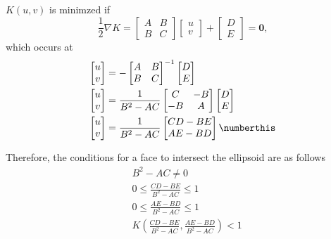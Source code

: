 $K(u,v)$ is minimzed if
\begin{equation}
    \frac{1}{2}\nabla K =
    \begin{bmatrix} A & B \\ B & C \end{bmatrix}
    \begin{bmatrix} u \\ v \end{bmatrix}
    + \begin{bmatrix} D \\ E \end{bmatrix}
    = \bm{0},
\end{equation}
which occurs at
\begin{align*}
    \begin{bmatrix} u \\ v \end{bmatrix} &= -\begin{bmatrix} A & B \\ B & C \end{bmatrix}^{-1} \begin{bmatrix} D \\ E \end{bmatrix} \\
    \begin{bmatrix} u \\ v \end{bmatrix} &= \frac{1}{B^2 - AC} \begin{bmatrix} C & -B \\ -B & A \end{bmatrix} \begin{bmatrix} D \\ E \end{bmatrix} \\
    \begin{bmatrix} u \\ v \end{bmatrix} &= \frac{1}{B^2 - AC} \begin{bmatrix} CD - BE \\ AE - BD \end{bmatrix} \numberthis
\end{align*}

Therefore, the conditions for a face to intersect the ellipsoid are as follows
\begin{align}
    &B^2 - AC \neq 0 \\
    &0 \leq \frac{CD - BE}{B^2 - AC} \leq 1 \\
    &0 \leq \frac{AE - BD}{B^2 - AC} \leq 1 \\
    &K\left(\frac{CD - BE}{B^2 - AC}, \frac{AE - BD}{B^2 - AC} \right) < 1
\end{align}

